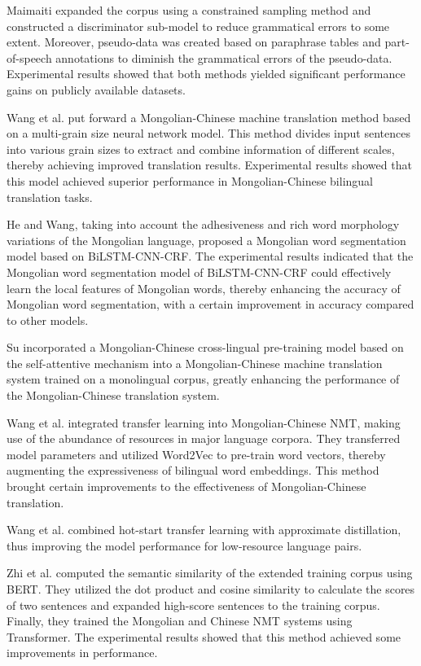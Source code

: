 \documentclass[acmsmall]{acmart}
\begin{document}
Maimaiti \cite{4-2b4} expanded the corpus using a constrained sampling method and constructed a discriminator sub-model to reduce grammatical errors to some extent. Moreover, pseudo-data was created based on paraphrase tables and part-of-speech annotations to diminish the grammatical errors of the pseudo-data. Experimental results showed that both methods yielded significant performance gains on publicly available datasets.


Wang et al. \cite{4-1} put forward a Mongolian-Chinese machine translation method based on a multi-grain size neural network model. This method divides input sentences into various grain sizes to extract and combine information of different scales, thereby achieving improved translation results. Experimental results showed that this model achieved superior performance in Mongolian-Chinese bilingual translation tasks. 

He and Wang\cite{4-3}, taking into account the adhesiveness and rich word morphology variations of the Mongolian language, proposed a Mongolian word segmentation model based on BiLSTM-CNN-CRF. The experimental results indicated that the Mongolian word segmentation model of BiLSTM-CNN-CRF could effectively learn the local features of Mongolian words, thereby enhancing the accuracy of Mongolian word segmentation, with a certain improvement in accuracy compared to other models. 

Su\cite{4-4} incorporated a Mongolian-Chinese cross-lingual pre-training model based on the self-attentive mechanism into a Mongolian-Chinese machine translation system trained on a monolingual corpus, greatly enhancing the performance of the Mongolian-Chinese translation system. 

Wang et al. \cite{4-5} integrated transfer learning into Mongolian-Chinese NMT, making use of the abundance of resources in major language corpora. They transferred model parameters and utilized Word2Vec to pre-train word vectors, thereby augmenting the expressiveness of bilingual word embeddings. This method brought certain improvements to the effectiveness of Mongolian-Chinese translation. 

Wang et al. \cite{4-6} combined hot-start transfer learning with approximate distillation, thus improving the model performance for low-resource language pairs. 

Zhi et al. \cite{4-6b1} computed the semantic similarity of the extended training corpus using BERT. They utilized the dot product and cosine similarity to calculate the scores of two sentences and expanded high-score sentences to the training corpus. Finally, they trained the Mongolian and Chinese NMT systems using Transformer. The experimental results showed that this method achieved some improvements in performance.
\end{document}
